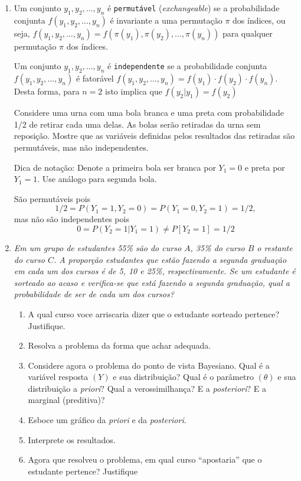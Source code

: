 \documentclass[11pt,a4]{article}\usepackage[]{graphicx}\usepackage[]{xcolor}
\begin{document}
\begin{enumerate}

\begin{solucao}
\end{solucao}


\item Um conjunto $y_1, y_2, \ldots, y_n$ é {\tt permutável} ({\it exchangeable}) se a probabilidade conjunta  $f(y_1, y_2, \ldots, y_n)$ é invariante a uma permutação $\pi$ dos índices,
  ou seja,  $f(y_1, y_2, \ldots,y_n) = f(\pi(y_1), \pi(y_2), \ldots, \pi(y_n))$ para qualquer permutação $\pi$ dos índices.

  Um conjunto $y_1, y_2, \ldots, y_n$ é {\tt independente} se a probabilidade conjunta  $f(y_1, y_2, \ldots, y_n)$ é fatorável  $f(y_1, y_2, \ldots, y_n) =  f(y_1) \cdot f(y_2) \cdot f(y_n)$. Desta forma, para $n=2$ isto implica que $f(y_2|y_1) = f(y_2)$

Considere uma urna com uma bola branca e uma preta com probabilidade 1/2 de retirar cada uma delas. As bolas serão retiradas da urna sem reposição. Mostre que as variáveis definidas pelos resultados das retiradas são permutáveis, mas não independentes.

Dica de notação: Denote a primeira bola ser branca por $Y_1 = 0$  e preta por $Y_1 = 1$. Use análogo para segunda bola.  

\begin{solucao}
São permutáveis pois 
\[ 1/2 = P(Y_1 = 1, Y_2 = 0) = P(Y_1 = 0, Y_2 = 1) = 1/2, \]
mas não são independentes pois
\[0 = P(Y_2 = 1|Y_1 = 1) \neq P[Y_2 = 1] = 1/2 \]
\end{solucao}
    
  
\item  \textit{
Em um grupo de estudantes 55\% são do curso $A$, 35\% do curso $B$ o restante do
curso $C$. A proporção estudantes que estão fazendo a segunda graduação em cada um dos cursos é de 5, 10  e 25\%, respectivamente. 
Se um estudante é sorteado ao acaso e verifica-se que está fazendo a segunda graduação, qual a probabilidade de
ser de cada um dos cursos?}
\begin{enumerate}
\item A qual curso voce arriscaria dizer que o estudante sorteado pertence? Justifique.
\item Resolva a problema da forma que achar adequada.
\item Considere agora o problema do ponto de vista Bayesiano.
  Qual é a variável resposta $(Y)$ e sua distribuição?
  Qual é o parâmetro $(\theta)$ e sua distribuição a {\it priori}?
 Qual a verossimilhança? E a {\it posteriori}? E a marginal (preditiva)?
\item Esboce um gráfico da {\it priori} e da {\it posteriori}.
\item Interprete os resultados.
\item Agora que resolveu o problema, em qual curso ``apostaria'' que  o estudante pertence? Justifique
\end{enumerate}


\end{enumerate}
\end{document}
